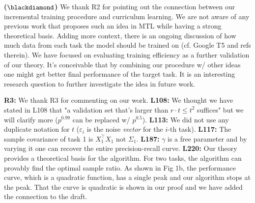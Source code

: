 \documentclass{article}
\begin{document}
\vspace{-0.045in}
\textbf{($\blackdiamond$)}  We thank R2 for pointing out the connection between our incremental training procedure and curriculum learning.
We are not aware of any previous work that proposes such an idea in MTL while having a strong theoretical basis.
Adding more context, there is an ongoing discussion of how much data from each task the model should be trained on (cf. Google T5 and refs therein).
We have focused on evaluating training efficiency as a further validation of our theory.
It's conceivable that by combining our procedure w/ other ideas one might get better final performance of the target task.
It is an interesting research question to further investigate the idea in future work.

\vspace{-0.025in}
\textbf{R3:}
We thank R3 for commenting on our work.
\textbf{L108:}
We thought we have stated in L108 that "a validation set that's larger than $r\cdot t \le t^2$ suffices" but we will clarify more ($p^{0.99}$ can be replaced w/ $p^{0.5}$).
\textbf{L113:} We did not use any duplicate notation for $t$ ($\varepsilon_i$ is the noise \textit{vector} for the $i$-th task).
\textbf{L117:} The sample covariance of task 1 is  $X_1^{\top}X_1$ not $\Sigma_1$.
\textbf{L187:} $\gamma$ is a free parameter and by varying it one can recover the entire precision-recall curve.
\textbf{L220:} Our theory provides a theoretical basis for the algorithm.
For two tasks, the algorithm can provably find the optimal sample ratio. As shown in Fig 1b, the performance curve, which is a quadratic function, has a single peak and our algorithm stops at the peak.
That the curve is quadratic is shown in our proof and we have added the connection to the draft.
\end{document}
